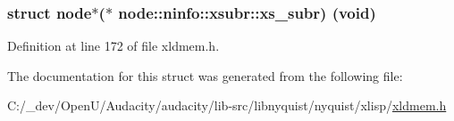 \subsubsection[{\texorpdfstring{xs\+\_\+subr}{xs_subr}}]{\setlength{\rightskip}{0pt plus 5cm}struct {\bf node}$\ast$($\ast$ node\+::ninfo\+::xsubr\+::xs\+\_\+subr) ({\bf void})}\hypertarget{structnode_1_1ninfo_1_1xsubr_aedc8ae4886790f4b1c89ea7abb4f93a5}{}\label{structnode_1_1ninfo_1_1xsubr_aedc8ae4886790f4b1c89ea7abb4f93a5}


Definition at line 172 of file xldmem.\+h.



The documentation for this struct was generated from the following file\+:\begin{DoxyCompactItemize}
\item 
C\+:/\+\_\+dev/\+Open\+U/\+Audacity/audacity/lib-\/src/libnyquist/nyquist/xlisp/\hyperlink{xldmem_8h}{xldmem.\+h}\end{DoxyCompactItemize}
